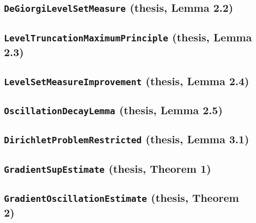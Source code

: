 \documentclass[11pt]{amsart}
\theoremstyle{definition}
\begin{document}
\subsection{\texorpdfstring{\texttt{DeGiorgiLevelSetMeasure} (thesis, Lemma 2.2)}{DeGiorgiLevelSetMeasure}}\label{node:DeGiorgiLevelSetMeasure}


\subsection{\texorpdfstring{\texttt{LevelTruncationMaximumPrinciple} (thesis, Lemma 2.3)}{LevelTruncationMaximumPrinciple}}\label{node:LevelTruncationMaximumPrinciple}


\subsection{\texorpdfstring{\texttt{LevelSetMeasureImprovement} (thesis, Lemma 2.4)}{LevelSetMeasureImprovement}}\label{node:LevelSetMeasureImprovement}


\subsection{\texorpdfstring{\texttt{OscillationDecayLemma} (thesis, Lemma 2.5)}{OscillationDecayLemma}}\label{node:OscillationDecayLemma}


\subsection{\texorpdfstring{\texttt{DirichletProblemRestricted} (thesis, Lemma 3.1)}{DirichletProblemRestricted}}\label{node:DirichletProblemRestricted}


\subsection{\texorpdfstring{\texttt{GradientSupEstimate} (thesis, Theorem 1)}{GradientSupEstimate}}\label{node:GradientSupEstimate}


\subsection{\texorpdfstring{\texttt{GradientOscillationEstimate} (thesis, Theorem 2)}{GradientOscillationEstimate}}\label{node:GradientOscillationEstimate}

\end{document}
